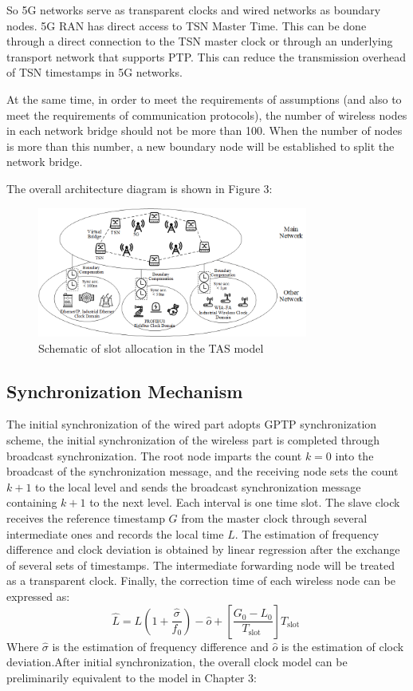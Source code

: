 \documentclass[english]{cccconf}
\begin{document}
So 5G networks serve as transparent clocks and wired networks as boundary nodes. 5G RAN has direct access to TSN Master Time. This can be done through a direct connection to the TSN master clock or through an underlying transport network that supports PTP. This can reduce the transmission overhead of TSN timestamps in 5G networks. 

At the same time, in order to meet the requirements of assumptions (and also to meet the requirements of communication protocols), the number of wireless nodes in each network bridge should not be more than 100. When the number of nodes is more than this number, a new boundary node will be established to split the network bridge.

The overall architecture diagram is shown in Figure 3:
\begin{figure}[htbp]
	\centering
	\setcounter{figure}{2}
	\includegraphics[width=3.5in]{fig17.png}
	\caption{Schematic of slot allocation in the TAS model}
\end{figure}
\subsection{Synchronization Mechanism}
The initial synchronization of the wired part adopts GPTP synchronization scheme, the initial synchronization of the wireless part is completed through broadcast synchronization. The root node imparts the count $k=0$ into the broadcast of the synchronization message, and the receiving node sets the count $k+1$ to the local level and sends the broadcast synchronization message containing $k+1$ to the next level. Each interval is one time slot. The slave clock receives the reference timestamp $G$ from the master clock through several intermediate ones and records the local time $L$. The estimation of frequency difference and clock deviation is obtained by linear regression after the exchange of several sets of timestamps. The intermediate forwarding node will be treated as a transparent clock. Finally, the correction time of each wireless node can be expressed as:
\begin{equation}
	\widehat{L}=L\left(1+\frac{\widehat{\sigma}}{f_0}\right)-\widehat{o}+\left[\frac{G_0-L_0}{T_{\text {slot }}}\right] T_{\text {slot }}
\end{equation}
Where $\widehat{\sigma}$ is the estimation of frequency difference and $\widehat{o}$ is the estimation of clock deviation.After initial synchronization, the overall clock model can be preliminarily equivalent to the model in Chapter 3:
\end{document}
